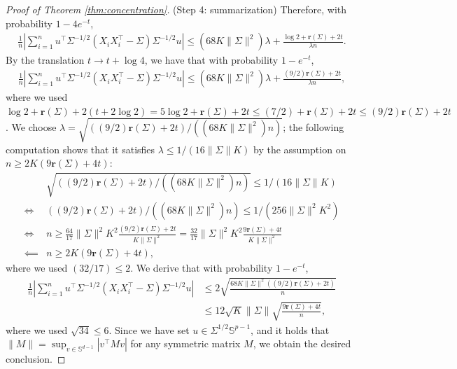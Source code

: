 \documentclass[11pt,a4paper]{article}
\theoremstyle{remark}
\theoremstyle{definition}
\newcommand{\bX}{X}
\newcommand{\bu}{u}
\newcommand{\bv}{v}
\newcommand{\bfM}{M}
\newcommand{\bSigma}{\Sigma}
\newcommand{\bbS}{\mathbb{S}}
\newcommand{\er}{\mathbf{r}}
\theoremstyle{definition}
\begin{document}
\begin{bibunit}[apalike]
\begin{proof}[Proof of Theorem \ref{thm:concentration}]
    (Step 4: summarization) Therefore, with probability $1-4e^{-t}$,
    \begin{align*}
        \frac{1}{n}\left|\sum_{i=1}^{n}\bu^{\top}\bSigma^{-1/2}\left(\bX_{i}\bX_{i}^{\top}-\bSigma\right)\bSigma^{-1/2}\bu
      \right|\le (68K\|\bSigma\|^{2})\lambda +\frac{\log2+\er(\bSigma)+2t}{\lambda n}.
    \end{align*}
    By the translation $t\to t+\log4$, we have that with probability $1-e^{-t}$,
    \begin{align*}
        \frac{1}{n}\left|\sum_{i=1}^{n}\bu^{\top}\bSigma^{-1/2}\left(\bX_{i}\bX_{i}^{\top}-\bSigma\right)\bSigma^{-1/2}\bu
      \right|\le (68K\|\bSigma\|^{2})\lambda +\frac{(9/2)\er(\bSigma)+2t}{\lambda n},
    \end{align*}
    where we used $\log2+\er(\bSigma)+2(t+2\log2)=5\log2+\er(\bSigma)+2t\le (7/2)+\er(\bSigma)+2t\le (9/2)\er(\bSigma)+2t$.
    We choose $\lambda=\sqrt{((9/2)\er(\bSigma)+2t)/((68K\|\bSigma\|^{2})n)}$; the following computation shows that it satisfies $\lambda\le 1/(16\|\bSigma\|K)$ by the assumption on $n\ge 2K(9\er(\bSigma)+4t)$:
    \begin{align*}
        &\sqrt{((9/2)\er(\bSigma)+2t)/((68K\|\bSigma\|^{2})n)}\le 1/(16\|\bSigma\|K)\\
        \iff &((9/2)\er(\bSigma)+2t)/((68K\|\bSigma\|^{2})n)\le 1/(256\|\bSigma\|^{2}K^{2})\\
        \iff &n\ge \frac{64}{17}\|\bSigma\|^{2}K^{2}\frac{(9/2)\er(\bSigma)+2t}{K\|\bSigma\|^{2}}=\frac{32}{17}\|\bSigma\|^{2}K^{2}\frac{9\er(\bSigma)+4t}{K\|\bSigma\|^{2}}\\
        \impliedby &n\ge 2K(9\er(\bSigma)+4t),
    \end{align*}
    where we used $(32/17)\le 2$.
    We derive that with probability $1-e^{-t}$,
    \begin{align*}
        \frac{1}{n}\left|\sum_{i=1}^{n}\bu^{\top}\bSigma^{-1/2}\left(\bX_{i}\bX_{i}^{\top}-\bSigma\right)\bSigma^{-1/2}\bu
       \right|
       &\le 2\sqrt{\frac{68K\|\bSigma\|^{2}((9/2)\er(\bSigma)+2t)}{n}}\\
       &\le 12\sqrt{K}\|\bSigma\|\sqrt{\frac{9\er(\bSigma)+4t}{n}},
    \end{align*}
    where we used $\sqrt{34}\le 6$.
    Since we have set $\bu\in\bSigma^{1/2}\bbS^{p-1}$, and it holds that $\|\bfM\|=\sup_{\bv\in\bbS^{d-1}}|\bv^{\top}\bfM\bv|$ for any symmetric matrix $\bfM$, we obtain the desired conclusion.
\end{proof}


\end{bibunit}
\end{document}
